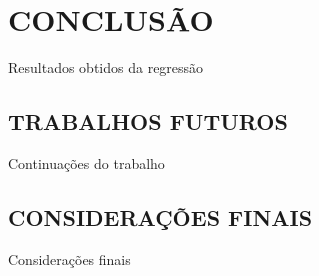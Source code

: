 
\chapter{CONCLUSÃO}
\label{chap:conclusao}
Resultados obtidos da regressão

\section{TRABALHOS FUTUROS}
\label{sec:trabalhosFuturos}
Continuações do trabalho

\section{CONSIDERAÇÕES FINAIS}
\label{sec:consideracoesFinais}
Considerações finais